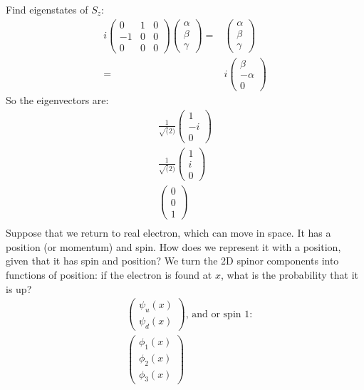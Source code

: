 \documentclass[]{article}
\begin{document}
Find eigenstates of $S_z$:
\begin{align*}
	i \begin{pmatrix}
		0&1&0\\
		-1&0&0\\
		0&0&0
	\end{pmatrix}\begin{pmatrix}
		\alpha\\
		\beta\\
		\gamma
	\end{pmatrix}=&\begin{pmatrix}
		\alpha\\
		\beta\\
		\gamma
	\end{pmatrix}\\
	=&i\begin{pmatrix}
		\beta\\
		-\alpha\\
		0
	\end{pmatrix}
\end{align*}
So the eigenvectors are:
\begin{align*}
	\frac{1}{\sqrt(2)}\begin{pmatrix}
		1\\
		-i\\
		0
	\end{pmatrix}\\
	\frac{1}{\sqrt(2)}\begin{pmatrix}
		1\\
		i\\
		0
	\end{pmatrix}\\
	\begin{pmatrix}
		0\\
		0\\
		1
	\end{pmatrix}\\
\end{align*}
Suppose that we return to real electron, which can move in space. It has a position (or momentum) and spin. How does we represent it with a position, given that it has spin and position? We turn the 2D spinor components into functions of position: if the electron is found at $x$, what is the probability that it is up?
\begin{align*}
	&\begin{pmatrix}
		\psi_u(x)\\
		\psi_d(x)
	\end{pmatrix} \text{, and or spin 1:}\\
	&\begin{pmatrix}
		\phi_1(x)\\
		\phi_2(x)\\
		\phi_3(x)
	\end{pmatrix}
\end{align*}
\end{document}
